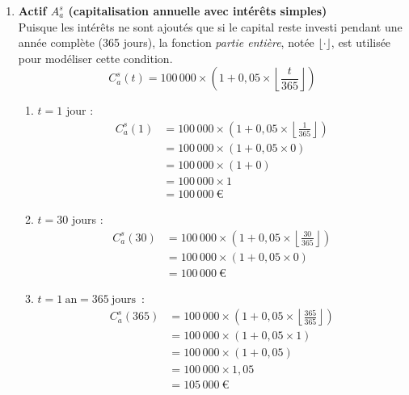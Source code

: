 \documentclass{article}
\begin{document}
\begin{enumerate}[label=\textbf{Q\arabic*.}]
\begin{enumerate}[label=(\alph*)]
    \end{enumerate}

    \item \textbf{Actif \( A_a^s \) (capitalisation annuelle avec intérêts simples)} \\
    Puisque les intérêts ne sont ajoutés que si le capital reste investi pendant une année complète (365 jours), la fonction \emph{partie entière}, notée $\lfloor \cdot \rfloor$, est utilisée pour modéliser cette condition.
    \[
    C_a^s(t) = 100\,000 \times \left(1 + 0,05 \times \left\lfloor \frac{t}{365} \right\rfloor \right)
    \]
    \begin{enumerate}[label=(\alph*)]
        \item \( t = 1 \) jour : 
        \begin{align*}
        C_a^s(1) &= 100\,000 \times \left(1 + 0,05 \times \left\lfloor \frac{1}{365} \right\rfloor \right) \\
                 &= 100\,000 \times \left(1 + 0,05 \times 0 \right) \\
                 &= 100\,000 \times (1 + 0) \\
                 &= 100\,000 \times 1 \\
                 &= \boxed{100\,000\ \text{€}}
        \end{align*}
        
        \item \( t = 30 \) jours : 
        \begin{align*}
        C_a^s(30) &= 100\,000 \times \left(1 + 0,05 \times \left\lfloor \frac{30}{365} \right\rfloor \right) \\
                 &= 100\,000 \times \left(1 + 0,05 \times 0 \right) \\
                 &= \boxed{100\,000\ \text{€}}
        \end{align*}
        
        \item $t = 1\ \text{an} = 365\ \text{jours}$~: 
        \begin{align*}
        C_a^s(365) &= 100\,000 \times \left(1 + 0,05 \times \left\lfloor \frac{365}{365} \right\rfloor \right) \\
                 &= 100\,000 \times \left(1 + 0,05 \times 1 \right) \\
                 &= 100\,000 \times \left(1 + 0,05 \right) \\
                 &= 100\,000 \times 1,05 \\
                 &= \boxed{105\,000\ \text{€}}
        \end{align*}
        

\end{enumerate}
\end{enumerate}
\end{document}
